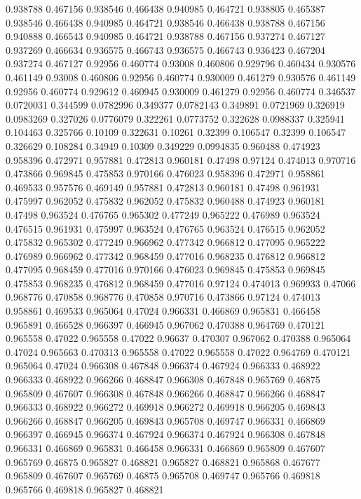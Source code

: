 0.938788 0.467156
0.938546 0.466438
0.940985 0.464721
0.938805 0.465387
0.938546 0.466438
0.940985 0.464721
0.938546 0.466438
0.938788 0.467156
0.940888 0.466543
0.940985 0.464721
0.938788 0.467156
0.937274 0.467127
0.937269 0.466634
0.936575 0.466743
0.936575 0.466743
0.936423 0.467204
0.937274 0.467127
0.92956 0.460774
0.93008 0.460806
0.929796 0.460434
0.930576 0.461149
0.93008 0.460806
0.92956 0.460774
0.930009 0.461279
0.930576 0.461149
0.92956 0.460774
0.929612 0.460945
0.930009 0.461279
0.92956 0.460774
0.346537 0.0720031
0.344599 0.0782996
0.349377 0.0782143
0.349891 0.0721969
0.326919 0.0983269
0.327026 0.0776079
0.322261 0.0773752
0.322628 0.0988337
0.325941 0.104463
0.325766 0.10109
0.322631 0.10261
0.32399 0.106547
0.32399 0.106547
0.326629 0.108284
0.34949 0.10309
0.349229 0.0994835
0.960488 0.474923
0.958396 0.472971
0.957881 0.472813
0.960181 0.47498
0.97124 0.474013
0.970716 0.473866
0.969845 0.475853
0.970166 0.476023
0.958396 0.472971
0.958861 0.469533
0.957576 0.469149
0.957881 0.472813
0.960181 0.47498
0.961931 0.475997
0.962052 0.475832
0.962052 0.475832
0.960488 0.474923
0.960181 0.47498
0.963524 0.476765
0.965302 0.477249
0.965222 0.476989
0.963524 0.476515
0.961931 0.475997
0.963524 0.476765
0.963524 0.476515
0.962052 0.475832
0.965302 0.477249
0.966962 0.477342
0.966812 0.477095
0.965222 0.476989
0.966962 0.477342
0.968459 0.477016
0.968235 0.476812
0.966812 0.477095
0.968459 0.477016
0.970166 0.476023
0.969845 0.475853
0.969845 0.475853
0.968235 0.476812
0.968459 0.477016
0.97124 0.474013
0.969933 0.47066
0.968776 0.470858
0.968776 0.470858
0.970716 0.473866
0.97124 0.474013
0.958861 0.469533
0.965064 0.47024
0.966331 0.466869
0.965831 0.466458
0.965891 0.466528
0.966397 0.466945
0.967062 0.470388
0.964769 0.470121
0.965558 0.47022
0.965558 0.47022
0.96637 0.470307
0.967062 0.470388
0.965064 0.47024
0.965663 0.470313
0.965558 0.47022
0.965558 0.47022
0.964769 0.470121
0.965064 0.47024
0.966308 0.467848
0.966374 0.467924
0.966333 0.468922
0.966333 0.468922
0.966266 0.468847
0.966308 0.467848
0.965769 0.46875
0.965809 0.467607
0.966308 0.467848
0.966266 0.468847
0.966266 0.468847
0.966333 0.468922
0.966272 0.469918
0.966272 0.469918
0.966205 0.469843
0.966266 0.468847
0.966205 0.469843
0.965708 0.469747
0.966331 0.466869
0.966397 0.466945
0.966374 0.467924
0.966374 0.467924
0.966308 0.467848
0.966331 0.466869
0.965831 0.466458
0.966331 0.466869
0.965809 0.467607
0.965769 0.46875
0.965827 0.468821
0.965827 0.468821
0.965868 0.467677
0.965809 0.467607
0.965769 0.46875
0.965708 0.469747
0.965766 0.469818
0.965766 0.469818
0.965827 0.468821
